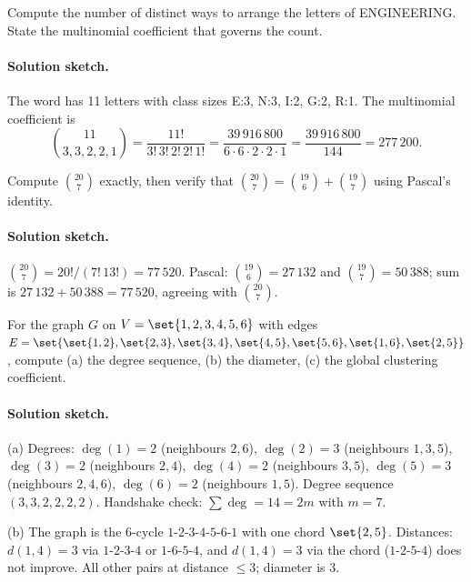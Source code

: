 \begin{exercise}
Compute the number of distinct ways to arrange the letters of
ENGINEERING. State the multinomial coefficient that governs the
count.
\end{exercise}

\paragraph{Solution sketch.} The word has 11 letters with class
sizes E:3, N:3, I:2, G:2, R:1. The multinomial coefficient is
\[
\binom{11}{3, 3, 2, 2, 1} = \frac{11!}{3!\, 3!\, 2!\, 2!\, 1!}
= \frac{39\,916\,800}{6 \cdot 6 \cdot 2 \cdot 2 \cdot 1}
= \frac{39\,916\,800}{144} = 277\,200.
\]

\begin{exercise}
Compute $\binom{20}{7}$ exactly, then verify that
$\binom{20}{7} = \binom{19}{6} + \binom{19}{7}$ using Pascal's
identity.
\end{exercise}

\paragraph{Solution sketch.}
$\binom{20}{7} = 20! / (7!\, 13!) = 77\,520$. Pascal:
$\binom{19}{6} = 27\,132$ and $\binom{19}{7} = 50\,388$; sum is
$27\,132 + 50\,388 = 77\,520$, agreeing with $\binom{20}{7}$.

\begin{exercise}
For the graph $G$ on $V = \set{1, 2, 3, 4, 5, 6}$ with edges $E =
\set{\set{1,2}, \set{2,3}, \set{3,4}, \set{4,5}, \set{5,6},
\set{1,6}, \set{2,5}}$, compute (a) the degree sequence, (b) the
diameter, (c) the global clustering coefficient.
\end{exercise}

\paragraph{Solution sketch.}
(a) Degrees: $\deg(1) = 2$ (neighbours $2, 6$), $\deg(2) = 3$
(neighbours $1, 3, 5$), $\deg(3) = 2$ (neighbours $2, 4$),
$\deg(4) = 2$ (neighbours $3, 5$), $\deg(5) = 3$ (neighbours $2,
4, 6$), $\deg(6) = 2$ (neighbours $1, 5$). Degree sequence
$(3, 3, 2, 2, 2, 2)$. Handshake check: $\sum \deg = 14 = 2 m$
with $m = 7$.

(b) The graph is the 6-cycle $1\text{-}2\text{-}3\text{-}4\text{-}5\text{-}6\text{-}1$
with one chord $\set{2, 5}$. Distances:
$d(1, 4) = 3$ via $1\text{-}2\text{-}3\text{-}4$ or
$1\text{-}6\text{-}5\text{-}4$, and $d(1, 4) = 3$ via the chord
($1\text{-}2\text{-}5\text{-}4$) does not improve. All other
pairs at distance $\leq 3$; diameter is $3$.

